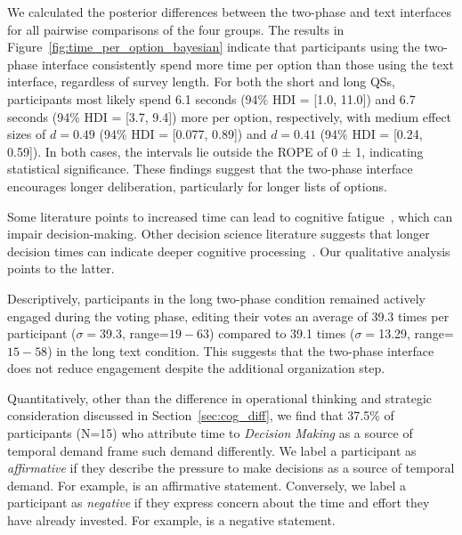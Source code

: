 We calculated the posterior differences between the two-phase and text interfaces for all pairwise comparisons of the four groups. The results in Figure~\ref{fig:time_per_option_bayesian} indicate that participants using the two-phase interface consistently spend more time per option than those using the text interface, regardless of survey length. For both the short and long QSs, participants most likely spend 6.1 seconds (94\% HDI = [1.0, 11.0]) and 6.7 seconds (94\% HDI = [3.7, 9.4]) more per option, respectively, with medium effect sizes of $d=0.49$ (94\% HDI = [0.077, 0.89]) and $d=0.41$ (94\% HDI = [0.24, 0.59]). In both cases, the intervals lie outside the ROPE of 0 ± 1, indicating statistical significance. These findings suggest that the two-phase interface encourages longer deliberation, particularly for longer lists of options.

Some literature points to increased time can lead to cognitive fatigue~\cite{kundingerReliableGroundTruth2020, karim2024examining}, which can impair decision-making. Other decision science literature suggests that longer decision times can indicate deeper cognitive processing~\cite{payneAdaptiveDecisionMaker1993, daniel2017thinking}. Our qualitative analysis points to the latter.

Descriptively, participants in the long two-phase condition remained actively engaged during the voting phase, editing their votes an average of 39.3 times per participant ($\sigma=$39.3, range=$19-63$) compared to 39.1 times ($\sigma=$13.29, range=$15-58$) in the long text condition. This suggests that the two-phase interface does not reduce engagement despite the additional organization step.

Quantitatively, other than the difference in operational thinking and strategic consideration discussed in Section~\ref{sec:cog_diff}, we find that 37.5\% of participants (N=15) who attribute time to \textit{Decision Making} as a source of temporal demand frame such demand differently. We label a participant as \textit{affirmative} if they describe the pressure to make decisions as a source of temporal demand. For example,  is an affirmative statement. Conversely, we label a participant as \textit{negative} if they express concern about the time and effort they have already invested. For example,  is a negative statement.


